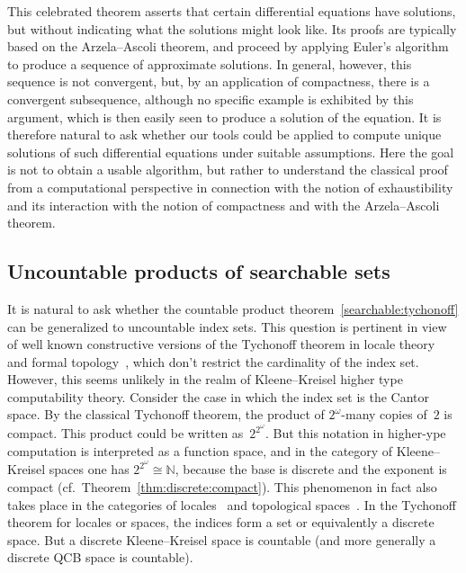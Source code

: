 \documentclass{LMCS}
\newcommand{\N}{\mathbb{N}}
\newcommand{\Bool}{2}\newcommand{\Sierp}{\mathcal{S}}
\begin{document}
This celebrated theorem asserts that certain differential equations
have solutions, but without indicating what the solutions might look
like.  Its proofs are typically based on the Arzela--Ascoli theorem,
and proceed by applying Euler's algorithm to produce a sequence of
approximate solutions. In general, however, this sequence is not
convergent, but, by an application of compactness, there is a
convergent subsequence, although no specific example is exhibited by
this argument, which is then easily seen to produce a solution of the
equation.  It is therefore natural to ask whether our tools could be
applied to compute unique solutions of such differential equations
under suitable assumptions.  Here the goal is not to obtain a usable
algorithm, but rather to understand the classical proof from a
computational perspective in connection with the notion of
exhaustibility and its interaction with the notion of compactness and
with the Arzela--Ascoli theorem.

\subsection{Uncountable products of searchable sets}

It is natural to ask whether the countable product
theorem~\ref{searchable:tychonoff} can be generalized to uncountable
index sets.  This question is pertinent in view of well known
constructive versions of the Tychonoff theorem in locale
theory~\cite{MR641111} and formal topology~\cite{MR1150923}, which
don't restrict the cardinality of the index set.  However, this seems
unlikely in the realm of Kleene--Kreisel higher type computability
theory.  Consider the case in which the index set is the Cantor space.
By the classical Tychonoff theorem, the product of $\Bool^\omega$-many
copies of~$\Bool$ is compact.  This product could be written
as~$\Bool^{\Bool^\omega}$. But this notation in higher-ype
computation is interpreted as a function space, and in the category of
Kleene--Kreisel spaces one has $\Bool^{\Bool^\omega}\cong \N$, because
the base is discrete and the exponent is compact (cf.\
Theorem~\ref{thm:discrete:compact}).  This phenomenon in fact also
takes place in the categories of locales~\cite{hyland:functionspaces}
and topological spaces~\cite{escardo:barbados}. In the Tychonoff
theorem for locales or spaces, the indices form a set or equivalently a
discrete space. But a discrete Kleene--Kreisel space is countable (and
more generally a discrete QCB space is countable).
\end{document}
